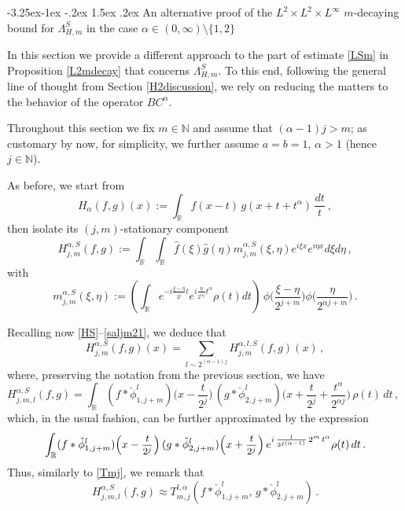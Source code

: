\documentclass[a4paper,reqno]{amsart}
\makeatletter
\def\subsection{\@startsection{subsection}{2}{\z@}%
	{-3.25ex\@plus -1ex \@minus -.2ex}%
	{1.5ex \@plus .2ex}%
	{\normalfont\bfseries\boldmath}}
\numberwithin{equation}{section}
\theoremstyle{definition}
\newcommand{\R}{\mathbb{R}}
\newcommand{\N}{\mathbb{N}}
\newcommand{\sdfrac}[2]{\mbox{\small$\displaystyle\frac{#1}{#2}$}}
\def\a{\alpha}
\def\L{\Lambda}
\makeatother
\begin{document}
\subsection{An alternative proof of the $L^2\times L^2\times L^\infty$ $m$-decaying bound for $\L^{S}_{H,m}$ in the case $\a\in (0,\infty)\setminus\{1,2\}$}




In this section we provide a different approach to the part of estimate \eqref{LSm} in Proposition \ref{L2mdecay} that concerns $\L^{S}_{H,m}$. To this end, following the general line of thought from Section \ref{H2discussion}, we rely on reducing the matters to the behavior of the operator $BC^{\a}$.

Throughout this section we fix $m\in\N$ and assume that $(\a-1)j>m$; as customary by now, for simplicity, we further assume $a=b=1$, $\a>1$ (hence $j\in\N$).

As before, we start from
	\begin{equation}\label{bht20a}
		H_{\a}(f,g)(x):= \int_{\R} f(x-t)\, g(x+t+t^{\a})\,\frac{dt}{t}\:,
	\end{equation}
then isolate its $(j,m)$-stationary component
\begin{equation}\label{saljm}
		H^{\a,S}_{j,m}(f,g):=\int_\R\int_\R \hat{f}(\xi)\hat{g}(\eta)m_{j,m}^{\a,S}(\xi,\eta)e^{i\xi x}e^{i\eta x}d\xi d\eta\,,
\end{equation}
with
\begin{equation}
		m_{j,m}^{\a,S}(\xi,\eta):=\left(\int_\R e^{-i\frac{\xi-\eta}{2^j}  t}e^{i\frac{\eta}{2^{\a j}}t^\a}\rho(t)dt\right)\,
		\phi\Big(\frac{\xi-\eta}{2^{j+m}}\Big)\phi\Big(\frac{\eta}{2^{\a j+m}}\Big)\,.
\end{equation}

Recalling now \eqref{HS}--\eqref{saljm21}, we deduce that
\begin{equation}\label{saljmsum}
H^{\a,S}_{j,m}(f,g)(x)=\sum_{l\sim 2^{(\a-1)j}}H^{\a,l,S}_{j,m}(f,g)(x)\,,
\end{equation}
where, preserving the notation from the previous section, we have
\begin{equation}\label{saljm2-3}
H^{\a,S}_{j,m,l}(f,g)=\int_{\R}  (f*\check{\phi}_{1,j+m}^l)\Big(x-\frac{t}{2^j}\Big)\,(g*\check{\phi}_{2,j+m}^l)\Big(x+\frac{t}{2^j}+\frac{t^\a}{2^{\a j}}\Big)\, \rho(t)\,dt\,,\quad
\end{equation}
which, in the usual fashion, can be further approximated by the expression
\begin{equation}\label{saljm4}
\int_{\R}  (f*\check{\phi}_{1,j+m}^l)\Big(x-\sdfrac{t}{2^j}\Big)\,
		(g*\check{\phi}_{2,j+m}^l)\Big(x+\sdfrac{t}{2^j}\Big)\,e^{i\,\frac{l}{2^{j (\a-1)}}\,2^m\,t^\a}\rho(t)\,dt\,.
\end{equation}
Thus, similarly to \eqref{Tmj}, we remark that
\begin{equation}\label{Tmjeqal}
H^{\a,S}_{j,m,l}(f,g)\approx T_{m,j}^{l,\a}(f*\check{\phi}_{1,j+m}^l,\,g*\check{\phi}_{2,j+m}^l)\,.
\end{equation}
\end{document}
